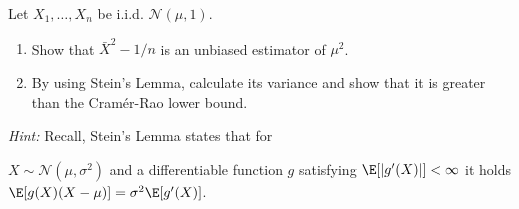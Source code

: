 
\begin{exercise}

Let $X_1,\dots,X_n$ be i.i.d. $\mathcal{N}(\mu,1)$.

\begin{enumerate}[label = (\alph*)]
  \item Show that $\bar{X}^2 - 1/n$ is an unbiased estimator of $\mu^2$.
  \item By using Stein's Lemma, calculate its variance and show that it is
  greater than the Cramér-Rao lower bound.
\end{enumerate}
    
\textit{Hint:} Recall, Stein's Lemma states that for 

$X \sim \mathcal{N}(\mu,\sigma^2)$
and a differentiable function $g$ satisfying $\E[|g'(X)|] < \infty$ it holds
$\E[g(X)(X - \mu)] = \sigma^2\E[g'(X)]$.
\end{exercise}
    
    
